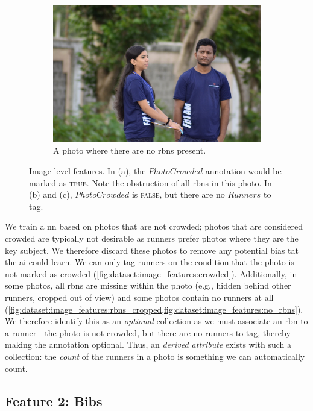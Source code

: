 \begin{figure}[th]
\begin{subfigure}[b]{0.4\textwidth}
    \includegraphics[width=\textwidth]{images/dataset/ImageFeatures_Optional_NoRBNs}
    \caption{\footnotesize A photo where there are no \glspl{rbn} present.}
    \label{fig:dataset:image_features:no_rbns}
  \end{subfigure} 
  \caption[Various image-level features]{Image-level features. In (a), the $PhotoCrowded$ annotation would be marked as \textsc{true}. Note the obstruction of all \glspl{rbn} in this photo. In (b) and (c), $PhotoCrowded$ is \textsc{false}, but there are no $Runners$ to tag.}
  \label{fig:dataset:image_features}
\end{figure}

We train a \gls{nn} based on photos that are not crowded; photos that are considered crowded are typically not desirable as runners prefer photos where they are the key subject. We therefore discard these photos to remove any potential bias tat the \gls{ai} could learn. We can only tag runners on the condition that the photo is not marked as crowded (\cref{fig:dataset:image_features:crowded}). Additionally, in some photos, all \glspl{rbn} are missing within the photo (e.g., hidden behind other runners, cropped out of view) and some photos contain no runners at all (\cref{fig:dataset:image_features:rbns_cropped,fig:dataset:image_features:no_rbns}). We therefore identify this as an \textit{optional} collection as we must associate an \gls{rbn} to a runner---the photo is not crowded, but there are no runners to tag, thereby making the annotation optional. Thus, an \textit{derived attribute} exists with such a collection: the \textit{count} of the runners in a photo is something we can automatically count.

\subsection{Feature 2: Bibs}

